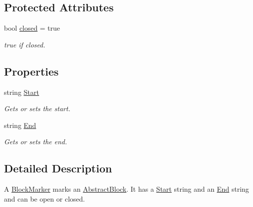 \subsection*{Protected Attributes}
\begin{DoxyCompactItemize}
\item 
bool \hyperlink{class_a_rdev_kit_1_1_model_1_1_project_1_1_file_1_1_block_marker_add534689f3e6af2448ee6194305ceafc}{closed} = true
\begin{DoxyCompactList}\small\item\em true if closed. \end{DoxyCompactList}\end{DoxyCompactItemize}
\subsection*{Properties}
\begin{DoxyCompactItemize}
\item 
string \hyperlink{class_a_rdev_kit_1_1_model_1_1_project_1_1_file_1_1_block_marker_a7764ae600714a07a74b8ddf55f1a59d5}{Start}
\begin{DoxyCompactList}\small\item\em Gets or sets the start. \end{DoxyCompactList}\item 
string \hyperlink{class_a_rdev_kit_1_1_model_1_1_project_1_1_file_1_1_block_marker_a3672477b3c409c07c7189a57fbd004c4}{End}
\begin{DoxyCompactList}\small\item\em Gets or sets the end. \end{DoxyCompactList}\end{DoxyCompactItemize}


\subsection{Detailed Description}
A \hyperlink{class_a_rdev_kit_1_1_model_1_1_project_1_1_file_1_1_block_marker}{Block\-Marker} marks an \hyperlink{class_a_rdev_kit_1_1_model_1_1_project_1_1_file_1_1_abstract_block}{Abstract\-Block}. It has a \hyperlink{class_a_rdev_kit_1_1_model_1_1_project_1_1_file_1_1_block_marker_a7764ae600714a07a74b8ddf55f1a59d5}{Start} string and an \hyperlink{class_a_rdev_kit_1_1_model_1_1_project_1_1_file_1_1_block_marker_a3672477b3c409c07c7189a57fbd004c4}{End} string and can be open or closed. 


